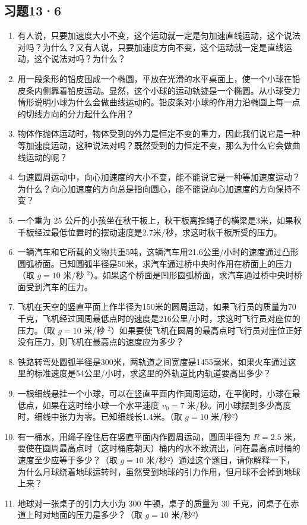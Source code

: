 \subsection{习题13·6}\label{ux4e60ux9898136}

\begin{enumerate}
\def\labelenumi{\arabic{enumi}.}
\item
  有人说，只要加速度大小不变，这个运动就一定是匀加速直线运动，这个说法对吗？为什么？又有人说，只要加速度方向不变，这个运动就一定是直线运动，这个说法对吗？为什么？
\item
  用一段条形的铅皮围成一个椭圆，平放在光滑的水平桌面上，使一个小球在铅皮条内侧靠着铅皮运动。显然，这个小球的运动轨迹是一个椭圆。从小球受力情形说明小球为什么会做曲线运动的。铅皮条对小球的作用力沿椭圆上每一点的切线方向的分力起什么作用？
\item
  物体作抛体运动时，物体受到的外力是恒定不变的重力，因此我们说它是一种等加速度运动，这种说法对吗？既然受到的力恒定不变，那么为什么它会做曲线运动的呢？
\item
  匀速圆周运动中，向心加速度的大小不变，能不能说它是一种等加速度运动？为什么？向心加速度的方向总是指向圆心，能不能说向心加速度的方向保持不变？
\item
  一个重为 25
  公斤的小孩坐在秋干板上，秋干板离拴绳子的横梁是3米，如果秋千板经过最低位置时的摆动速度是2.7米/秒，求这时秋千板所受的压力。
\item
  一辆汽车和它所载的文物共重5吨，这辆汽车用21.6公里/小时的速度通过凸形圆弧桥面。已知圆弧半径是50米，求汽车通过桥中央时作用在桥面上的压力（取
  \(g=10\) 米/秒
  \(^{2}\)）。如果这个桥面是凹形圆弧桥面，求汽车通过桥中央时桥面受到汽车的压力。
\item
  飞机在天空的竖直平面上作半径为150米的圆周运动，如果飞行员的质量为70千克，飞机经过圆周最低点时的速度是216公里/小时，求这时飞行员对座位的压力。（取
  \(g=10\) 米/秒
  \(^{2}\)）如果要使飞机在圆周的最高点时飞行员对座位正好没有压力，则飞机在最高点的速度应为多少？
\item
  铁路转弯处圆弧半径是300米，两轨道之间宽度是1455毫米，如果火车通过这里的标准速度是54公里/小时，求这里的外轨道比内轨道要高出多少？
\item
  一根细线悬挂一个小球，可以在竖直平面内作圆周运动，在平衡时，小球在最低点，如果在这时给小球一个水平速度
  \(v_0 = 7\)
  米/秒。问小球摆到多少高度时，细线中张力为零。已知细线长1.4米。（取
  \(g = 10\) 米/秒²）
\item
  有一桶水，用绳子拴住后在竖直平面内作圆周运动，圆周半径为 \(R = 2.5\)
  米，要使在圆周最高点时（这时桶底朝天）桶内的水不致流出，问在最高点时桶的速度至少应等于多少？（取
  \(g = 10\)
  米/秒²）通过这个题目，请你解释一下，为什么月球绕着地球运转时，虽然受到地球的引力作用，但月球不会掉到地球上来？
\item
  地球对一张桌子的引力大小为 300 牛顿，桌子的质量为 30
  千克，问桌子在赤道上时对地面的压力是多少？（取 \(g = 10\) 米/秒²）
\end{enumerate}

